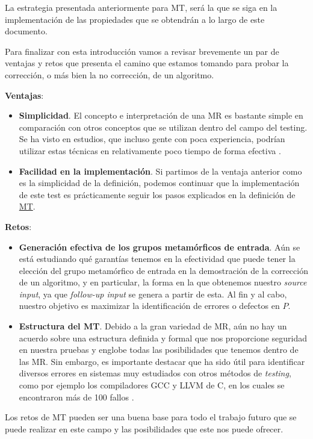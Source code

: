 La estrategia presentada anteriormente para MT, será la que se siga en la implementación de las propiedades que se obtendrán a lo largo de este documento. \newline

Para finalizar con esta introducción vamos a revisar brevemente un par de ventajas y retos que presenta el camino que estamos tomando para probar la corrección, o más bien la no corrección, de un algoritmo. \newline

\textbf{Ventajas}:
\begin{itemize}
    \item \textbf{Simplicidad}. El concepto e interpretación de una MR es bastante simple en comparación con otros conceptos que se utilizan dentro del campo del testing. Se ha visto en estudios, que incluso gente con poca experiencia, podrían utilizar estas técnicas en relativamente poco tiempo de forma efectiva \cite{AR:MTmain:2008}\cite{Note:MT55}\cite{Note:MT73}.
    \item \textbf{Facilidad en la implementación}. Si partimos de la ventaja anterior como es la simplicidad de la definición, podemos continuar que la implementación de este test es prácticamente seguir los pasos explicados en la definición de \hyperref[Def:MT]{MT}.
\end{itemize}

\vspace{10pt}

\textbf{Retos}:
\begin{itemize}
    \item \textbf{Generación efectiva de los grupos metamórficos de entrada}. Aún se está estudiando qué garantías tenemos en la efectividad que puede tener la elección del grupo metamórfico de entrada en la demostración de la corrección de un algoritmo, y en particular, la forma en la que obtenemos nuestro \textit{source input}, ya que \textit{follow-up input} se genera a partir de esta. Al fin y al cabo, nuestro objetivo es maximizar la identificación de errores o defectos en $P$.
    
    \item \textbf{Estructura del MT}. Debido a la gran variedad de MR, aún no hay un acuerdo sobre una estructura definida y formal que nos proporcione seguridad en nuestra pruebas y englobe todas las posibilidades que tenemos dentro de las MR. Sin embargo, es importante destacar que ha sido útil para identificar diversos errores en sistemas muy estudiados con otros métodos de \textit{testing}, como por ejemplo los compiladores GCC y LLVM de C, en los cuales se encontraron más de 100 fallos \cite{AR:MTmain:2008}\cite{Note:MT50}\cite{Note:MT51}\cite{Note:MT78}.
\end{itemize}

Los retos de MT pueden ser una buena base para todo el trabajo futuro que se puede realizar en este campo y las posibilidades que este nos puede ofrecer.



